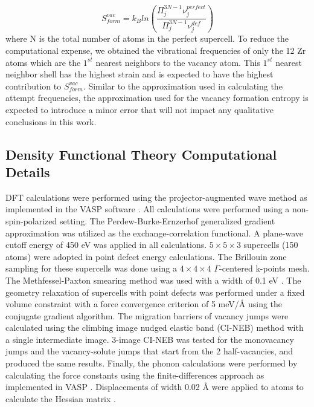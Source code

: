 \documentclass[preprint,12pt]{elsarticle}
\begin{document}
\begin{equation}
    S_{form}^{vac} = k_B ln(\frac{\Pi^{3N-1}_j \nu_j^{perfect}}{\Pi^{3N-1}_j \nu_j^{def}})
\end{equation}
where N is the total number of atoms in the perfect supercell. To reduce the computational expense, we obtained the vibrational frequencies of only the 12 Zr atoms which are the $1^{st}$ nearest neighbors to the vacancy atom. This $1^{st}$ nearest neighbor shell has the highest strain and is expected to have the highest contribution to $S_{form}^{vac}$. Similar to the approximation used in calculating the attempt frequencies, the approximation used for the vacancy formation entropy is expected to introduce a minor error that will not impact any qualitative conclusions in this work.

\FloatBarrier

\subsection{Density Functional Theory Computational Details}

DFT calculations were performed using the projector-augmented wave method \cite{blochl_projector_1994} as implemented in the VASP software \cite{kresse_ab_1993, kresse_efficient_1996}. All calculations were performed using a non-spin-polarized setting. The Perdew-Burke-Ernzerhof generalized gradient approximation \cite{perdew_generalized_1996} was utilized as the exchange-correlation functional. A plane-wave cutoff energy of 450 eV was applied in all calculations. $5\times5\times3$ supercells (150 atoms) were adopted in point defect energy calculations. The Brillouin zone sampling for these supercells was done using a $4\times4\times4$ $\Gamma$-centered k-points mesh. The Methfessel-Paxton smearing method was used with a width of 0.1 eV  \cite{methfessel_high-precision_1989}. The geometry relaxation of supercells with point defects was performed under a fixed volume constraint with a force convergence criterion of 5 meV/{\AA} using the conjugate gradient algorithm. The migration barriers of vacancy jumps were calculated using the climbing image nudged elastic band (CI-NEB) method \cite{henkelman_climbing_2000} with a single intermediate image. 3-image CI-NEB was tested for the monovacancy jumps and the vacancy-solute jumps that start from the 2 half-vacancies, and produced the same results. Finally, the phonon calculations were performed by calculating the force constants using the finite-differences approach as implemented in VASP \cite{kresse_ab_1993,kresse_efficient_1996}. Displacements of width 0.02 {\AA} were applied to atoms to calculate the Hessian matrix \cite{hafner_ab-initio_2008}.
\end{document}
